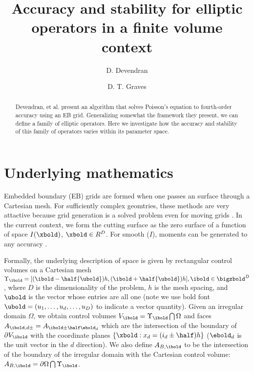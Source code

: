 \documentclass{article}
\begin{document}
\title{Accuracy and stability for elliptic operators
  in a finite volume context}
\author{
   \and D. Devendran    \footnotemark[2]
   \and D. T. Graves    \footnotemark[1]
        }

\maketitle

\begin{abstract}

Devendran, et al. \cite{Devendran2017} present an algorithm that
solves Poisson's equation to fourth-order accuracy using an EB grid.
Generalizing somewhat  the framework they present, we can define a
family of elliptic operators.
Here we investigate how the accuracy and stability of this family
of operators varies within its parameter space.

\end{abstract}


\section{Underlying mathematics}

Embedded boundary (EB) grids are formed when one passes an  surface
through a Cartesian mesh.    For sufficiently complex geomtries, these methods
are very attactive because grid generation is a solved problem
even for moving grids \cite{MillerTrebotich2012}.
In the current context, we form the cutting surface as the zero
surface of a function  of space $I(\xbold)$, $\xbold \in R^D$.
For smooth ($I$),  moments can be generated to any
accuracy \cite{Schwartz2015}.

Formally, the underlying description of space
is given by rectangular control volumes on a Cartesian mesh
$\Upsilon_\ibold = [(\ibold-\half {\ubold})h, (\ibold+\half
{\ubold})h], \ibold \in \bigzbold^D$, where $D$ is the dimensionality
of the problem, $h$ is the mesh spacing, and ${\ubold}$ is the vector
whose entries are all one (note we use bold font $\ubold = (u_1, \dots, u_d,
\dots, u_D)$ to indicate a vector quantity).
Given an irregular domain $\Omega$, we
obtain control volumes $V_\ibold = \Upsilon_\ibold \bigcap \Omega$ and
faces $A_{\ibold,d\pm} = A_{\ibold \pm \half \ebold_d}$ which are the
intersection of the boundary of $\partial V_\ibold$ with the
coordinate planes $\{{\xbold}:x_d = (i_d \pm \half)h \}$ ($\ebold_d$ is
the unit vector in the $d$ direction).  We also
define $A_{B,\ibold}$ to be the intersection of the boundary of the
irregular domain with the Cartesian control volume: $A_{B,\ibold}
= \partial \Omega \bigcap \Upsilon_\ibold$. 
\end{document}
